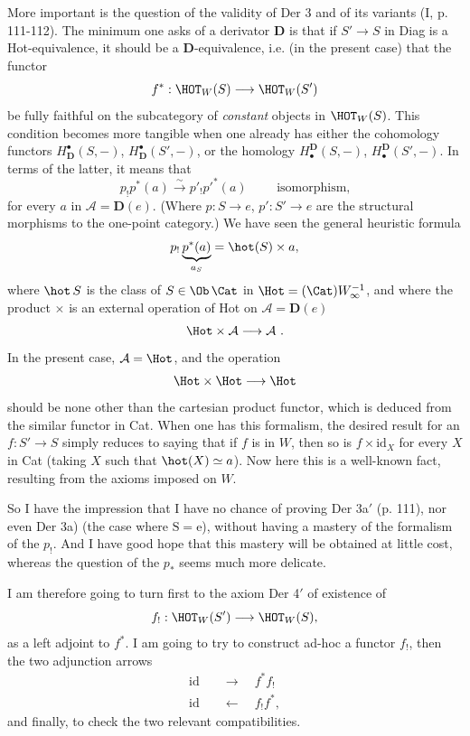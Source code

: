 More important is the question of the validity of Der 3 and of its variants (I, p. 111-112). The minimum one asks of a derivator $\mathbf{D}$ is that if $S'\longrightarrow S$ in Diag is a Hot-equivalence, it should be a $\mathbf{D}$-equivalence, i.e. (in the present case) that the functor
\[ f^* : \HOT_W(S) \longrightarrow \HOT_W(S') \]
be fully faithful on the subcategory of \textit{constant} objects in $\HOT_W(S)$. This condition becomes more tangible when one already has either the cohomology functors $H^\bullet_{\mathbf{D}}(S,-)$, $H^\bullet_{\mathbf{D}}(S',-)$, or the homology $H_\bullet^{\mathbf{D}}(S,-)$, $H_\bullet^{\mathbf{D}}(S',-)$. In terms of the latter, it means that
\[ p_!p^*(a) \xrightarrow{\sim} p'_!p'^*(a) \qquad \text{ isomorphism,} \]
for every $a$ in $\mathcal{A}=\mathbf{D}(e)$. (Where $p:S\longrightarrow e$, $p':S'\longrightarrow e$ are the structural morphisms to the one-point category.) We have seen the general heuristic formula
\[ p_!\underbrace{p^*(a)}_{a_S} = \hot(S)\times a, \]
where $\hot\,S$ is the class of $S\in\Ob\,\Cat$ in $\Hot=(\Cat)W_\infty^{-1}$, and where the product $\times$ is an external operation of Hot on $\mathcal{A}=\mathbf{D}(e)$
\[ \Hot\times\mathcal{A} \longrightarrow \mathcal{A}\ . \]
In the present case, $\mathcal{A}=\Hot$, and the operation
\[ \Hot\times\Hot \longrightarrow \Hot \]
should be none other than the cartesian product functor, which is deduced from the similar functor in Cat. When one has this formalism, the desired result for an $f:S'\longrightarrow S$ simply reduces to saying that if $f$ is in $W$, then so is $f\times\mathrm{id}_X$ for every $X$ in Cat (taking $X$ such that $\hot(X)\simeq a$). Now here this is a well-known fact, resulting from the axioms imposed on $W$.

So I have the impression that I have no chance of proving Der 3a$'$ (p. 111), nor even Der 3a) (the case where $\mathrm{S}=\mathrm{e}$), without having a mastery of the formalism of the $p_!$. And I have
good hope that this mastery will be obtained at little cost, whereas the question of the $p_*$ seems much more delicate. %

I am therefore going to turn first to the axiom Der 4$'$ of existence of
\[ f_! : \HOT_W(S') \longrightarrow \HOT_W(S), \]
as a left adjoint to $f^*$. I am going to try to construct ad-hoc a functor $f_!$, then the two adjunction arrows
\[ \begin{aligned} \mathrm{id} &\quad\longrightarrow\quad f^*f_! \\ \mathrm{id} &\quad\longleftarrow\quad f_!f^*, \end{aligned} \]
and finally, to check the two relevant compatibilities.

